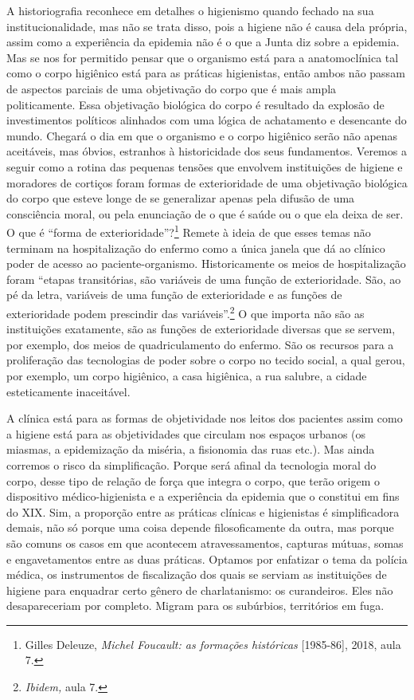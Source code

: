 A historiografia reconhece em detalhes o higienismo quando fechado na
sua institucionalidade, mas não se trata disso, pois a higiene não é
causa dela própria, assim como a experiência da epidemia não é o que a
Junta diz sobre a epidemia. Mas se nos for permitido pensar que o
organismo está para a anatomoclínica tal como o corpo higiênico está
para as práticas higienistas, então ambos não passam de aspectos
parciais de uma objetivação do corpo que é mais ampla politicamente.
Essa objetivação biológica do corpo é resultado da explosão de
investimentos políticos alinhados com uma lógica de achatamento e
desencante do mundo. Chegará o dia em que o organismo e o corpo
higiênico serão não apenas aceitáveis, mas óbvios, estranhos à
historicidade dos seus fundamentos. Veremos a seguir como a rotina das
pequenas tensões que envolvem instituições de higiene e moradores de
cortiços foram formas de exterioridade de uma objetivação biológica do
corpo que esteve longe de se generalizar apenas pela difusão de uma
consciência moral, ou pela enunciação de o que é saúde ou o que ela
deixa de ser. O que é ``forma de exterioridade''?\footnote{Gilles
  Deleuze, \emph{Michel Foucault: as formações históricas}
  {[}1985-86{]}, 2018, aula 7.} Remete à ideia de que esses temas não
terminam na hospitalização do enfermo como a única janela que dá ao
clínico poder de acesso ao paciente-organismo. Historicamente os meios
de hospitalização foram ``etapas transitórias, são variáveis de uma
função de exterioridade. São, ao pé da letra, variáveis de uma função de
exterioridade e as funções de exterioridade podem prescindir das
variáveis''.\footnote{\emph{Ibidem,} aula 7.} O que importa não são as
instituições exatamente, são as funções de exterioridade diversas que se
servem, por exemplo, dos meios de quadriculamento do enfermo. São os
recursos para a proliferação das tecnologias de poder sobre o corpo no
tecido social, a qual gerou, por exemplo, um corpo higiênico, a casa
higiênica, a rua salubre, a cidade esteticamente inaceitável.

A clínica está para as formas de objetividade nos leitos dos pacientes
assim como a higiene está para as objetividades que circulam nos espaços
urbanos (os miasmas, a epidemização da miséria, a fisionomia das ruas
etc.). Mas ainda corremos o risco da simplificação. Porque será afinal
da tecnologia moral do corpo, desse tipo de relação de força que integra
o corpo, que terão origem o dispositivo médico-higienista e a
experiência da epidemia que o constitui em fins do XIX. Sim, a proporção
entre as práticas clínicas e higienistas é simplificadora demais, não só
porque uma coisa depende filosoficamente da outra, mas porque são comuns
os casos em que acontecem atravessamentos, capturas mútuas, somas e
engavetamentos entre as duas práticas. Optamos por enfatizar o tema da
polícia médica, os instrumentos de fiscalização dos quais se serviam as
instituições de higiene para enquadrar certo gênero de charlatanismo: os
curandeiros. Eles não desapareceriam por completo. Migram para os
subúrbios, territórios em fuga.

